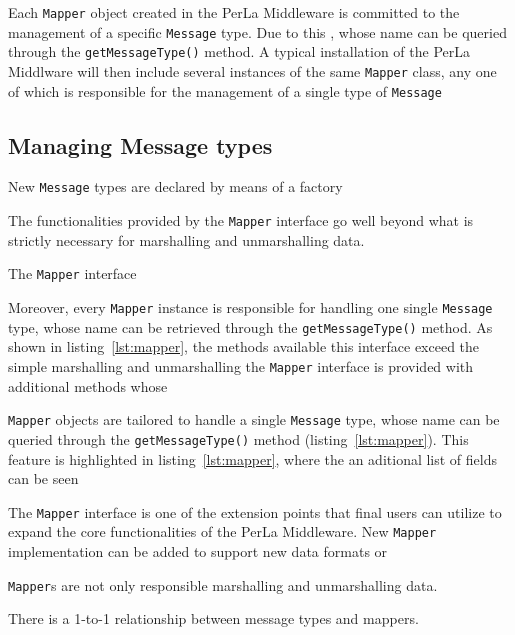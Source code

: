 Each \texttt{Mapper} object created in the PerLa Middleware is committed to the
management of a specific \texttt{Message} type. Due to this , whose name can be queried
through the \texttt{getMessageType()} method. A typical installation of the
PerLa Middlware will then include several instances of the same \texttt{Mapper}
class, any one of which is responsible for the management of a single type of
\texttt{Message}




\subsection{Managing Message types}

New \texttt{Message} types are declared by means of a factory

The functionalities provided by the \texttt{Mapper} interface go well beyond
what is strictly necessary for marshalling and unmarshalling data. 

The \texttt{Mapper} interface 







Moreover, every \texttt{Mapper} instance is responsible for handling one single
\texttt{Message} type, whose name can be retrieved through the
\texttt{getMessageType()} method. As shown in listing~\ref{lst:mapper}, the
methods available this interface exceed the simple marshalling and
unmarshalling the
\texttt{Mapper} interface is provided with additional methods whose

\texttt{Mapper} objects are tailored to handle a single \texttt{Message} type,
whose name can be queried through the \texttt{getMessageType()} method
(listing~\ref{lst:mapper}).
This feature is highlighted in listing~\ref{lst:mapper}, where the an aditional
list of fields can be seen 

The \texttt{Mapper} interface is one of the extension points that final users
can utilize to expand the core functionalities of the PerLa Middleware. New
\texttt{Mapper} implementation can be added to support new data formats or 









\texttt{Mapper}s are not only responsible marshalling and unmarshalling data. 

There is a 1-to-1 relationship between message types and mappers.

